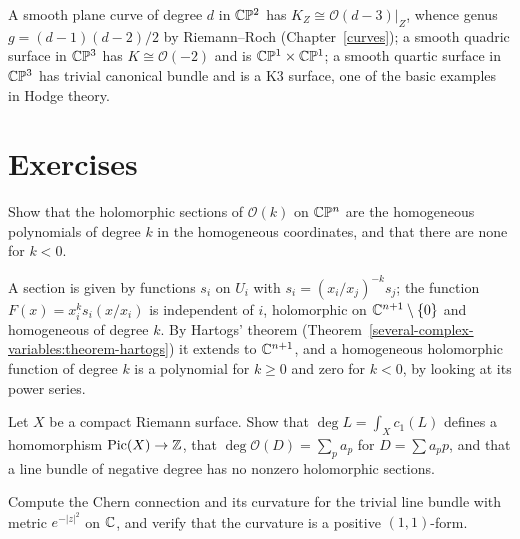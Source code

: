 \begin{example}\label{holomorphic-bundles:example-adjunction}
A smooth plane curve of degree $d$ in $\mathbb{C}\mathbb{P}^2$ has $K_Z \cong \mathcal{O}(d - 3)|_Z$, whence genus $g = (d-1)(d-2)/2$ by Riemann--Roch (Chapter~\ref{curves}); a smooth quadric surface in $\mathbb{C}\mathbb{P}^3$ has
$K \cong \mathcal{O}(-2)$ and is $\mathbb{C}\mathbb{P}^1 \times \mathbb{C}\mathbb{P}^1$; a smooth quartic surface in $\mathbb{C}\mathbb{P}^3$ has trivial canonical bundle and is a K3 surface, one of the basic examples in Hodge theory.
\end{example}

\section{Exercises}\label{holomorphic-bundles:section-exercises}

\begin{exercise}\label{holomorphic-bundles:exercise-sections-ok}
Show that the holomorphic sections of $\mathcal{O}(k)$ on $\mathbb{C}\mathbb{P}^n$ are the homogeneous polynomials of degree $k$ in the homogeneous coordinates, and that there are none for $k < 0$.
\end{exercise}

\begin{solution}
A section is given by functions $s_i$ on $U_i$ with $s_i = (x_i/x_j)^{-k}s_j$; the function $F(x) = x_i^ks_i(x/x_i)$ is independent of $i$, holomorphic on $\mathbb{C}^{n+1} \setminus \{0\}$ and homogeneous of degree
$k$. By Hartogs' theorem (Theorem~\ref{several-complex-variables:theorem-hartogs}) it extends to $\mathbb{C}^{n+1}$, and a homogeneous holomorphic function of degree $k$ is a polynomial for $k \geq 0$ and zero for
$k < 0$, by looking at its power series.
\end{solution}

\begin{exercise}\label{holomorphic-bundles:exercise-degree-line-bundle}
Let $X$ be a compact Riemann surface. Show that $\deg L = \int_Xc_1(L)$ defines a homomorphism $\operatorname{Pic}(X) \to \mathbb{Z}$, that $\deg\mathcal{O}(D) = \sum_pa_p$ for $D = \sum a_pp$, and that a line bundle of negative
degree has no nonzero holomorphic sections.
\end{exercise}

\begin{exercise}\label{holomorphic-bundles:exercise-chern-connection-trivial}
Compute the Chern connection and its curvature for the trivial line bundle with metric $e^{-|z|^2}$ on $\mathbb{C}$, and verify that the curvature is a positive $(1,1)$-form.
\end{exercise}

